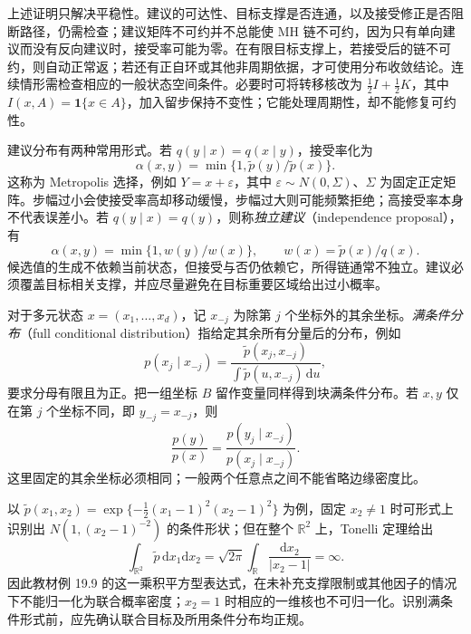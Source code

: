 上述证明只解决平稳性。建议的可达性、目标支撑是否连通，以及接受修正是否阻断路径，仍需检查；建议矩阵不可约并不总能使 MH 链不可约，因为只有单向建议而没有反向建议时，接受率可能为零。在有限目标支撑上，若接受后的链不可约，则自动正常返；若还有正自环或其他非周期依据，才可使用分布收敛结论。连续情形需检查相应的一般状态空间条件。必要时可将转移核改为 $\tfrac12 I+\tfrac12 K$，其中 $I(x,A)=\mathbf1\{x\in A\}$，加入留步保持不变性；它能处理周期性，却不能修复可约性。

建议分布有两种常用形式。若 $q(y\mid x)=q(x\mid y)$，接受率化为
\begin{equation}
\alpha(x,y)=\min\{1,\widetilde p(y)/\widetilde p(x)\}.
\label{eq:lh-mcmc-metropolis}
\end{equation}
这称为 Metropolis 选择，例如 $Y=x+\varepsilon$，其中 $\varepsilon\sim N(0,\Sigma)$、$\Sigma$ 为固定正定矩阵。步幅过小会使接受率高却移动缓慢，步幅过大则可能频繁拒绝；高接受率本身不代表误差小。若 $q(y\mid x)=q(y)$，则称\emph{独立建议}（independence proposal），有
\begin{equation}
\alpha(x,y)=\min\{1,w(y)/w(x)\},\qquad
w(x)=\widetilde p(x)/q(x).
\label{eq:lh-mcmc-independence-proposal}
\end{equation}
候选值的生成不依赖当前状态，但接受与否仍依赖它，所得链通常不独立。建议必须覆盖目标相关支撑，并应尽量避免在目标重要区域给出过小概率。

对于多元状态 $x=(x_1,\ldots,x_d)$，记 $x_{-j}$ 为除第 $j$ 个坐标外的其余坐标。\emph{满条件分布}（full conditional distribution）指给定其余所有分量后的分布，例如
\begin{equation}
p(x_j\mid x_{-j})
=\frac{\widetilde p(x_j,x_{-j})}
{\int\widetilde p(u,x_{-j})\,\mathrm du},
\label{eq:lh-mcmc-full-conditional}
\end{equation}
要求分母有限且为正。把一组坐标 $B$ 留作变量同样得到块满条件分布。若 $x,y$ 仅在第 $j$ 个坐标不同，即 $y_{-j}=x_{-j}$，则
\begin{equation}
\frac{p(y)}{p(x)}
=\frac{p(y_j\mid x_{-j})}{p(x_j\mid x_{-j})}.
\label{eq:lh-mcmc-conditional-ratio}
\end{equation}
这里固定的其余坐标必须相同；一般两个任意点之间不能省略边缘密度比。

\begin{notealert}[type=caution,title={形式上的条件密度不保证联合分布正规}]
以 $\widetilde p(x_1,x_2)=\exp\{-\tfrac12(x_1-1)^2(x_2-1)^2\}$ 为例，固定 $x_2\ne1$ 时可形式上识别出 $N(1,(x_2-1)^{-2})$ 的条件形状；但在整个 $\mathbb R^2$ 上，Tonelli 定理给出
\[
\int_{\mathbb R^2}\widetilde p\,\mathrm dx_1\mathrm dx_2
=\sqrt{2\pi}\int_{\mathbb R}\frac{\mathrm dx_2}{|x_2-1|}
=\infty.
\]
因此教材例 19.9 的这一乘积平方型表达式，在未补充支撑限制或其他因子的情况下不能归一化为联合概率密度；$x_2=1$ 时相应的一维核也不可归一化。识别满条件形式前，应先确认联合目标及所用条件分布均正规。
\end{notealert}

